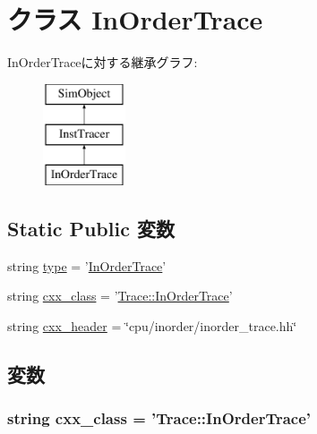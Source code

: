\hypertarget{classInOrderTrace_1_1InOrderTrace}{
\section{クラス InOrderTrace}
\label{classInOrderTrace_1_1InOrderTrace}
}
InOrderTraceに対する継承グラフ:\begin{figure}[H]
\begin{center}
\leavevmode
\includegraphics[height=3cm]{classInOrderTrace_1_1InOrderTrace}
\end{center}
\end{figure}
\subsection*{Static Public 変数}
\begin{DoxyCompactItemize}
\item 
string \hyperlink{classInOrderTrace_1_1InOrderTrace_acce15679d830831b0bbe8ebc2a60b2ca}{type} = '\hyperlink{classInOrderTrace_1_1InOrderTrace}{InOrderTrace}'
\item 
string \hyperlink{classInOrderTrace_1_1InOrderTrace_a58cd55cd4023648e138237cfc0822ae3}{cxx\_\-class} = '\hyperlink{classTrace_1_1InOrderTrace}{Trace::InOrderTrace}'
\item 
string \hyperlink{classInOrderTrace_1_1InOrderTrace_a17da7064bc5c518791f0c891eff05fda}{cxx\_\-header} = \char`\"{}cpu/inorder/inorder\_\-trace.hh\char`\"{}
\end{DoxyCompactItemize}


\subsection{変数}
\hypertarget{classInOrderTrace_1_1InOrderTrace_a58cd55cd4023648e138237cfc0822ae3}{
\subsubsection[{cxx\_\-class}]{\setlength{\rightskip}{0pt plus 5cm}string {\bf cxx\_\-class} = '{\bf Trace::InOrderTrace}'}}
\label{classInOrderTrace_1_1InOrderTrace_a58cd55cd4023648e138237cfc0822ae3}


